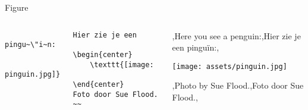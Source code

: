 \begin{frame}[fragile]{Figure}
    \begin{columns}
        \begin{column}{0.6\textwidth}
            \begin{verbatim}
                Hier zie je een pingu~\"i~n:
                \begin{center}
                    \texttt{[image: pinguin.jpg]}
                \end{center}
                Foto door Sue Flood.
                ~~
            \end{verbatim}
        \end{column}
        \begin{column}{0.4\textwidth}
            \lang,Here you see a penguin:,Hier zie je een pinguïn:,
        \begin{center}
            \texttt{[image: assets/pinguin.jpg]}
        \end{center}
        \lang,Photo by Sue Flood.,Foto door Sue Flood.,
        \end{column}
    \end{columns}


    
\end{frame}

